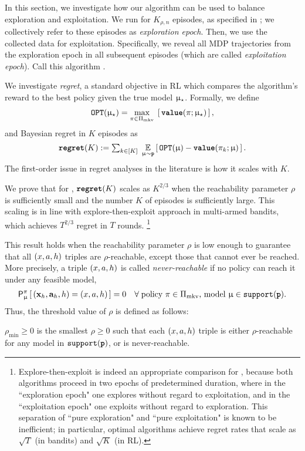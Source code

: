 
In this section, we investigate how our algorithm can be used to balance exploration and exploitation. We run \mdphh for $K_{\rho,n}$ episodes, as specified in ; we collectively refer to these episodes as \emph{exploration epoch}. Then, we use the collected data for exploitation. Specifically, we reveal all MDP trajectories from the exploration epoch in all subsequent episodes (which are called \emph{exploitation epoch}). Call this algorithm \HHandExploit.

We investigate \emph{regret}, a standard objective in RL which compares the algorithm's reward to the best policy given the true model $\upmu_{\star}$. Formally, we define
\begin{align*}%
    \OPT(\modst) = \max_{\pi\in\Pimarkov}\; \sbr{\valuef{\pi}{\modst}},
\end{align*}
and Bayesian regret in $K$ episodes as
\begin{align*}
\REG(K) :=
    {\textstyle \sum_{k\in [K]}}\;
        \Expop_{\model\sim\prior}\sbr{
            \OPT(\model) - \valuef{\pi_k}{\model}}.
\end{align*}
The first-order issue in regret analyses in the literature is how it scales with $K$.

We prove that for \HHandExploit, ${\normalfont \texttt{\textbf{regret}}}(K)$ scales as $K^{2/3}$ when the reachability parameter $\rho$ is sufficiently small and the number $K$ of episodes is sufficiently large. This scaling is in line with explore-then-exploit approach in multi-armed bandits, which achieves $T^{2/3}$ regret in $T$ rounds.%
\footnote{Explore-then-exploit is indeed an appropriate comparison for \HHandExploit, because both algorithms proceed in two epochs of predetermined duration, where in the ``exploration epoch" one explores without regard to exploitation, and in the ``exploitation epoch" one exploits without regard to exploration. This separation of ``pure exploration" and ``pure exploitation" is known to be inefficient; in particular, optimal algorithms achieve regret rates that scale as $\sqrt{T}$ (in bandits) and $\sqrt{K}$ (in RL).}

This result holds when the reachability parameter $\rho$ is low enough to guarantee that all $(x,a,h)$ triples are $\rho$-reachable, except those that cannot ever be reached. More precisely, a triple $(x,a,h)$ is called \emph{never-reachable} if no policy can reach it under any feasible model, \ie
    \begin{align*} \mathsf{P}^\pi_{\upmu}\left[\, (\mathbf{x}_h,\mathbf{a}_h,h) =(x,a,h)\,\right] = 0
        \quad \forall\;\text{policy  $\pi\in\Pi_{\mathrm{mkv}}$, model $\upmu\in \mathtt{support}({\normalfont \texttt{\textbf{p}}})$}.
    \end{align*}
Thus, the threshold value of $\rho$ is defined as follows:
    \begin{definition}
$\rho_{\min} \ge 0$ is  the smallest $\rho\geq 0$ such that each $(x,a,h)$ triple is either $\rho$-reachable for any model in $\mathtt{support}({\normalfont \texttt{\textbf{p}}})$, or is never-reachable.
\end{definition}


